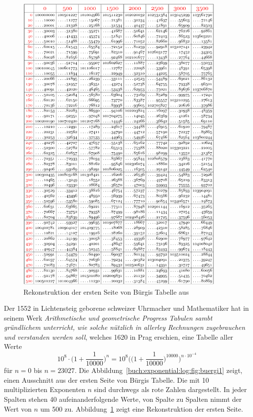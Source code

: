 \begin{figure}
\centering
\includegraphics[width=0.92\textwidth]{chapters/020-exponential/images/buergiausschnitt.pdf}
\caption{Rekonstruktion der ersten Seite von Bürgis Tabelle aus
\cite{buch:hal}
\label{buch:exponential:log:fig:buergi2}}
\end{figure}
Der 1552 in Lichtensteig geborene schweizer Uhrmacher und Mathematiker
hat in seinem Werk
{\em Arithmetische und geometrische Progress Tabulen sambt gründlichem 
unterricht, wie solche nützlich in allerley Rechnungen zugebrauchen
und verstanden werden soll}, welches 1620 in Prag erschien,
eine Tabelle aller Werte
\[
10^8\cdot\biggl(1+\frac{1}{10000}\biggr)^n
=
10^8 \biggl(\biggl(1+\frac{1}{10000}\biggr)^{10000}\biggr)^{n\cdot10^{-4}}
\]
für $n=0$ bis $n=23027$.
Die Abbildung~\ref{buch:exponential:log:fig:buergi1}
zeigt, einen Ausschnitt aus der ersten Seite von Bürgis Tabelle.
Die mit 10 multiplizierten Exponenten $n$ sind durchwegs als
{\color{red}rote} Zahlen dargestellt.
In jeder Spalten stehen 40 aufeinanderfolgende Werte, von Spalte
zu Spalten nimmt der Wert von $n$ um 500 zu.
Abbildung~\ref{buch:exponential:log:fig:buergi2} zeigt eine Rekonstruktion
der ersten Seite.


